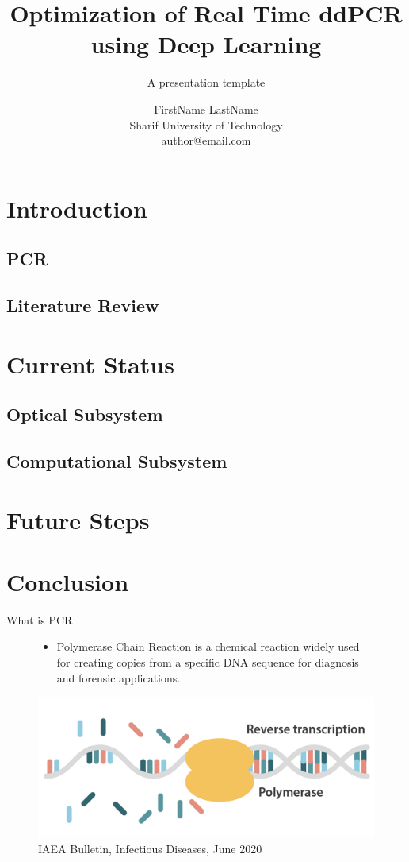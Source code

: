 \documentclass[UKenglish, aspectratio = 169]{beamer}
\author[Author Name]
{FirstName LastName\\Sharif University of Technology\\author@email.com}
\title{Optimization of Real Time ddPCR \\using Deep Learning}
\subtitle{A presentation template}
\begin{document}
     \begin{frame}[allowframebreaks]
    \tableofcontents
\end{frame}

\section{Introduction}
	\subsection{PCR}
	\subsection{Literature Review}
\section{Current Status}
	\subsection{Optical Subsystem}
	\subsection{Computational Subsystem}
\section{Future Steps}
\section{Conclusion}
	
\begin{frame}{What is PCR}
		\begin{figure}
			\vspace{0.5cm}
			\begin{itemize}
					\item Polymerase Chain Reaction is a chemical reaction widely used for creating copies from a specific DNA sequence for diagnosis and forensic applications.
				\end{itemize}
			\centering
			\vspace{0.2cm}
			\includegraphics[scale = 0.20]{figs/PCR.png}
			\caption{\tiny{IAEA Bulletin, Infectious Diseases, June 2020}}
		\end{figure}
\end{frame}
\end{document}
